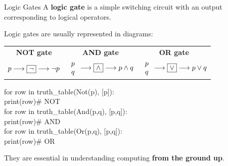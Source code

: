 \documentclass[aspectratio=169]{beamer}
\begin{document}
\begin{frame}[t]{Logic Gates}
  A \textbf{logic gate} is a simple switching circuit with an output corresponding to logical operators.
  \vspace{0.5em}

  Logic gates are usually represented in diagrams:
  \vspace{0.4em}

  \begin{center}
    \renewcommand{\arraystretch}{1.6}
    \begin{tabular}{ccc}
      \textbf{NOT gate} & \textbf{AND gate} & \textbf{OR gate}\\[4pt]
      $p \longrightarrow \framebox{$\neg$} \longrightarrow \neg p$
      &
      $\begin{array}{r}p\\q\end{array}
       \longrightarrow \framebox{$\wedge$} \longrightarrow p\wedge q$
      &
      $\begin{array}{r}p\\q\end{array}
       \longrightarrow \framebox{$\vee$} \longrightarrow p\vee q$
    \end{tabular}
  \end{center}

  \vspace{0.5em}
  \begin{tcolorbox}[spstyle, title=SymPy --- gate truth tables]
    for row in truth\_table(Not(p), [p]):\\
    \quad\quad print(row)\quad\# NOT\\
    for row in truth\_table(And(p,q), [p,q]):\\
    \quad\quad print(row)\quad\# AND\\
    for row in truth\_table(Or(p,q), [p,q]):\\
    \quad\quad print(row)\quad\# OR
  \end{tcolorbox}

  They are essential in understanding computing \textbf{from the ground up}.
\end{frame}
\end{document}

